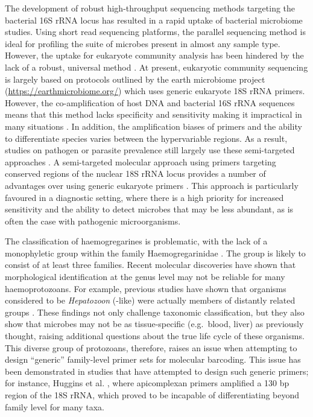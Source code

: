 \documentclass[a4paper, nobind]{templates/ociamthesis}
\begin{document}
The development of robust high-throughput sequencing methods targeting the bacterial 16S rRNA locus has resulted in a rapid uptake of bacterial microbiome studies.
Using short read sequencing platforms, the parallel sequencing method is ideal for profiling the suite of microbes present in almost any sample type.
However, the uptake for eukaryote community analysis has been hindered by the lack of a robust, universal method \autocite{hugerthSystematicDesign18S2014}.
At present, eukaryotic community sequencing is largely based on protocols outlined by the earth microbiome project (\url{https://earthmicrobiome.org/}) which uses generic eukaryote 18S rRNA primers.
However, the co-amplification of host DNA and bacterial 16S rRNA sequences means that this method lacks specificity and sensitivity making it impractical in many situations \autocite{kounosuImproved18S28S2019}.
In addition, the amplification biases of primers and the ability to differentiate species varies between the hypervariable regions.
As a result, studies on pathogen or parasite prevalence still largely use these semi-targeted approaches \autocite{ghafarTargetedNextGenerationSequencing2020,wahabNovelMetabarcoded18S2020}.
A semi-targeted molecular approach using primers targeting conserved regions of the nuclear 18S rRNA locus provides a number of advantages over using generic eukaryote primers \autocite{bradleyDesignEvaluationIllumina2016,cannonHighthroughputSequencingAssay2018a}.
This approach is particularly favoured in a diagnostic setting, where there is a high priority for increased sensitivity and the ability to detect microbes that may be less abundant, as is often the case with pathogenic microorganisms.

The classification of haemogregarines is problematic, with the lack of a monophyletic group within the family Haemogregarinidae \autocite{al-quraishyHaemogregarinesCriteriaIdentification2021}.
The group is likely to consist of at least three families.
Recent molecular discoveries have shown that morphological identification at the genus level may not be reliable for many haemoprotozoans.
For example, previous studies have shown that organisms considered to be \emph{Hepatozoon} (-like) were actually members of distantly related groups \autocite{merinoSarcocystidMisidentifiedHepatozoon2008,zhuLooksCanDeceive2009}.
These findings not only challenge taxonomic classification, but they also show that microbes may not be as tissue-specific (e.g.~blood, liver) as previously thought, raising additional questions about the true life cycle of these organisms.
This diverse group of protozoans, therefore, raises an issue when attempting to design ``generic'' family-level primer sets for molecular barcoding.
This issue has been demonstrated in studies that have attempted to design such generic primers; for instance, Huggins et al. \autocite*{hugginsNovelMetabarcodingDiagnostic2019}, where apicomplexan primers amplified a 130 bp region of the 18S rRNA, which proved to be incapable of differentiating beyond family level for many taxa.
\end{document}

